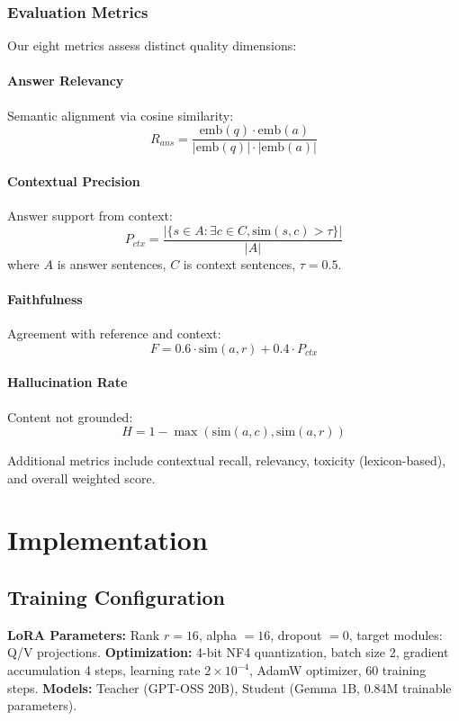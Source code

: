\documentclass[conference]{IEEEtran}
\begin{document}
\subsubsection{Evaluation Metrics}
Our eight metrics assess distinct quality dimensions:

\paragraph{Answer Relevancy} Semantic alignment via cosine similarity:
\begin{equation}
R_{ans} = \frac{\text{emb}(q) \cdot \text{emb}(a)}{|\text{emb}(q)| \cdot |\text{emb}(a)|}
\end{equation}

\paragraph{Contextual Precision} Answer support from context:
\begin{equation}
P_{ctx} = \frac{|\{s \in A : \exists c \in C, \text{sim}(s,c) > \tau\}|}{|A|}
\end{equation}
where $A$ is answer sentences, $C$ is context sentences, $\tau=0.5$.

\paragraph{Faithfulness} Agreement with reference and context:
\begin{equation}
F = 0.6 \cdot \text{sim}(a, r) + 0.4 \cdot P_{ctx}
\end{equation}

\paragraph{Hallucination Rate} Content not grounded:
\begin{equation}
H = 1 - \max(\text{sim}(a, c), \text{sim}(a, r))
\end{equation}

Additional metrics include contextual recall, relevancy, toxicity (lexicon-based), and overall weighted score.

\section{Implementation}

\subsection{Training Configuration}
\textbf{LoRA Parameters:} Rank $r=16$, alpha $=16$, dropout $=0$, target modules: Q/V projections. \textbf{Optimization:} 4-bit NF4 quantization, batch size 2, gradient accumulation 4 steps, learning rate $2 \times 10^{-4}$, AdamW optimizer, 60 training steps. \textbf{Models:} Teacher (GPT-OSS 20B), Student (Gemma 1B, 0.84M trainable parameters).
\end{document}
